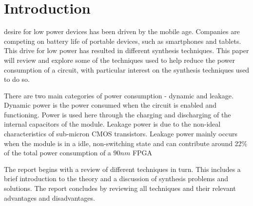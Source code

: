 

\section{Introduction}
 desire for low power devices has been driven by the mobile age.
Companies are competing on battery life of portable devices, such as smartphones and tablets.
This drive for low power has resulted in different synthesis techniques.
This paper will review and explore some of the techniques used to help reduce the power consumption of a circuit, with particular interest on the synthesis techniques used to do so.


There are two main categories of power consumption - dynamic and leakage. 
Dynamic power is the power consumed when the circuit is enabled and functioning. 
Power is used here through the charging and discharging of the internal capacitors of the module.
Leakage power is due to the non-ideal characteristics of sub-micron CMOS transistors.
Leakage power mainly occurs when the module is in a idle, non-switching state \cite{bsoul2010fpga} and can contribute around 22\% of the total power consumption of a $90nm$ FPGA \cite{altera2005}

The report begins with a review of different techniques in turn. 
This includes a brief introduction to the theory and a discussion of synthesis problems and solutions.
The report concludes by reviewing all techniques and their relevant advantages and disadvantages. 

